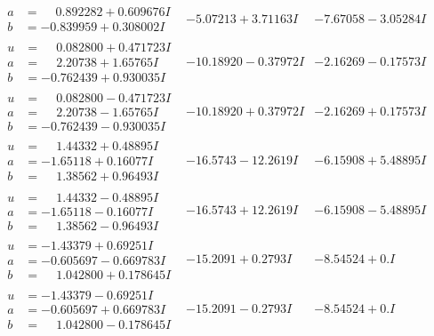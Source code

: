 \documentclass[1p]{elsarticle_modified}
\theoremstyle{definition}
\begin{document}
$$\begin{array}{c|c|c}
\begin{aligned}
a &= \phantom{-}0.892282 + 0.609676 I \\
b &= -0.839959 + 0.308002 I\end{aligned}
 & -5.07213 + 3.71163 I & -7.67058 - 3.05284 I \\ \hline\begin{aligned}
u &= \phantom{-}0.082800 + 0.471723 I \\
a &= \phantom{-}2.20738 + 1.65765 I \\
b &= -0.762439 + 0.930035 I\end{aligned}
 & -10.18920 - 0.37972 I & -2.16269 - 0.17573 I \\ \hline\begin{aligned}
u &= \phantom{-}0.082800 - 0.471723 I \\
a &= \phantom{-}2.20738 - 1.65765 I \\
b &= -0.762439 - 0.930035 I\end{aligned}
 & -10.18920 + 0.37972 I & -2.16269 + 0.17573 I \\ \hline\begin{aligned}
u &= \phantom{-}1.44332 + 0.48895 I \\
a &= -1.65118 + 0.16077 I \\
b &= \phantom{-}1.38562 + 0.96493 I\end{aligned}
 & -16.5743 - 12.2619 I & -6.15908 + 5.48895 I \\ \hline\begin{aligned}
u &= \phantom{-}1.44332 - 0.48895 I \\
a &= -1.65118 - 0.16077 I \\
b &= \phantom{-}1.38562 - 0.96493 I\end{aligned}
 & -16.5743 + 12.2619 I & -6.15908 - 5.48895 I \\ \hline\begin{aligned}
u &= -1.43379 + 0.69251 I \\
a &= -0.605697 - 0.669783 I \\
b &= \phantom{-}1.042800 + 0.178645 I\end{aligned}
 & -15.2091 + 0.2793 I & -8.54524 + 0. I\phantom{ +0.000000I} \\ \hline\begin{aligned}
u &= -1.43379 - 0.69251 I \\
a &= -0.605697 + 0.669783 I \\
b &= \phantom{-}1.042800 - 0.178645 I\end{aligned}
 & -15.2091 - 0.2793 I & -8.54524 + 0. I\phantom{ +0.000000I}\\

\end{array}$$
\end{document}
